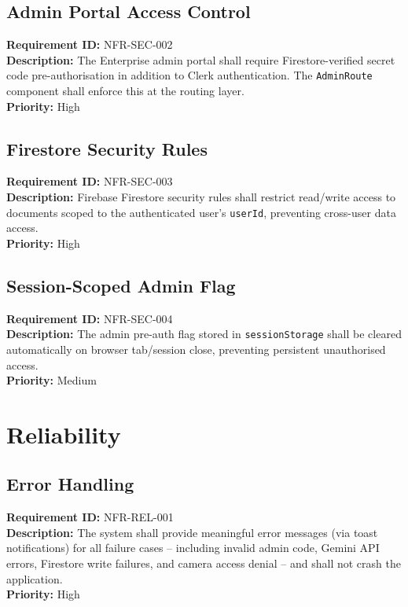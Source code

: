 \documentclass{fisatinternship}
\begin{document}
\vspace{0.3cm}

\subsection{Admin Portal Access Control}
\textbf{Requirement ID:} NFR-SEC-002\\
\textbf{Description:} The Enterprise admin portal shall require Firestore-verified secret
code pre-authorisation in addition to Clerk authentication. The \texttt{AdminRoute}
component shall enforce this at the routing layer.\\
\textbf{Priority:} High

\vspace{0.3cm}

\subsection{Firestore Security Rules}
\textbf{Requirement ID:} NFR-SEC-003\\
\textbf{Description:} Firebase Firestore security rules shall restrict read/write access
to documents scoped to the authenticated user's \texttt{userId}, preventing cross-user
data access.\\
\textbf{Priority:} High

\vspace{0.3cm}

\subsection{Session-Scoped Admin Flag}
\textbf{Requirement ID:} NFR-SEC-004\\
\textbf{Description:} The admin pre-auth flag stored in \texttt{sessionStorage} shall be
cleared automatically on browser tab/session close, preventing persistent unauthorised
access.\\
\textbf{Priority:} Medium

\section{Reliability}

\subsection{Error Handling}
\textbf{Requirement ID:} NFR-REL-001\\
\textbf{Description:} The system shall provide meaningful error messages (via toast
notifications) for all failure cases -- including invalid admin code, Gemini API errors,
Firestore write failures, and camera access denial -- and shall not crash the application.\\
\textbf{Priority:} High
\end{document}
